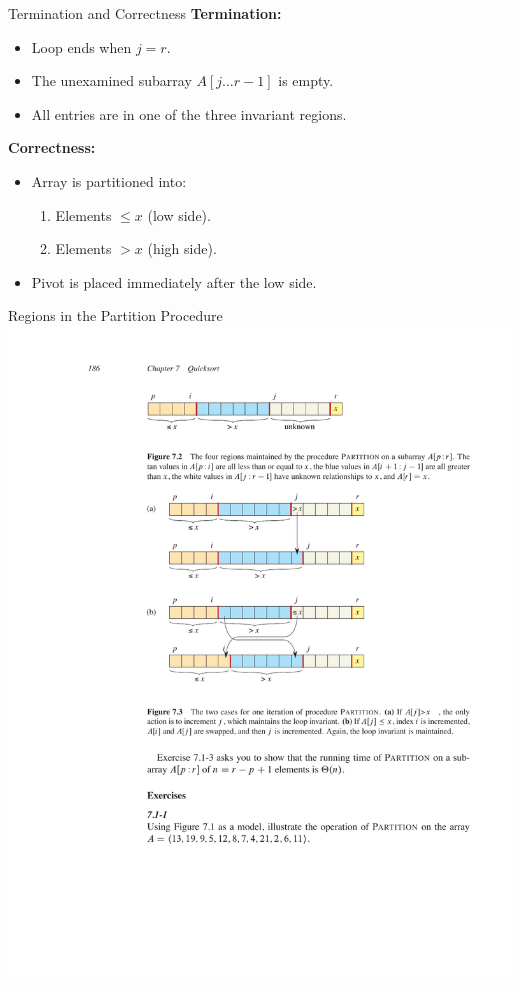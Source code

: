 \documentclass{beamer}
\begin{document}
\begin{frame}{Termination and Correctness}
    \textbf{Termination:}
    \begin{itemize}
        \item Loop ends when $j = r$.
        \item The unexamined subarray $A[j \dots r-1]$ is empty.
        \item All entries are in one of the three invariant regions.
    \end{itemize}
    \textbf{Correctness:}
    \begin{itemize}
        \item Array is partitioned into:
        \begin{enumerate}
            \item Elements $\leq x$ (low side).
            \item Elements $> x$ (high side).
        \end{enumerate}
        \item Pivot is placed immediately after the low side.
    \end{itemize}
\end{frame}

\begin{frame}{Regions in the Partition Procedure}
    \centering
    \includegraphics[width=\textwidth, trim={5.75cm 23.00cm 6.75cm 2.50cm}, clip]{figures/exchange}
\end{frame}
\end{document}
